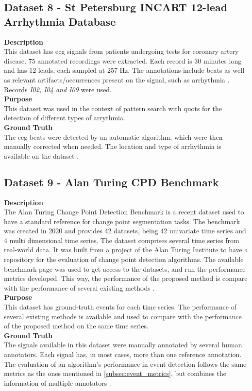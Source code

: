 \subsection{Dataset 8 - St Petersburg INCART 12-lead Arrhythmia Database}
\label{dat:dataset9}
\textbf{Description}\hfill \\
This dataset has \gls{ecg} signals from patients undergoing tests for coronary artery disease. 75 annotated recordings were extracted. Each record is 30 minutes long and has 12 leads, each sampled at 257 Hz. The annotations include beats as well as relevant artifacts/occurrences present on the signal, such as arrhythmia \cite{PhysioNet}. Records \textit{I02, I04 and I09} were used.\\
\textbf{Purpose}\hfill \\
This dataset was used in the context of pattern search with \gls{quots} for the detection of different types of arrythmia.\\
\textbf{Ground Truth}\\
The \gls{ecg} beats were detected by an automatic algorithm, which were then manually corrected when needed. The location and type of arrhythmia is available on the dataset \cite{ecg_arrhythmia}.

\subsection{Dataset 9 - Alan Turing CPD Benchmark}
\label{dat:dataset10}
\textbf{Description}\hfill \\
The Alan Turing Change Point Detection Benchmark is a recent dataset used to have a standard reference for change point segmentation tasks. The benchmark was created in 2020 and provides 42 datasets, being 42 univariate time series and 4 multi dimensional time series. The dataset comprises several time series from real-world data. It was built from a project of the Alan Turing Institute to have a repository for the evaluation of change point detection algorithms. The available benchmark page was used to get access to the datasets, and run the performance metrics developed. This way, the performance of the proposed method is compare with the performance of several existing methods \cite{cpd_alan}.\\
\textbf{Purpose}\hfill \\
This dataset has ground-truth events for each time series. The performance of several existing methods is available and used to compare with the performance of the proposed method on the same time series.\\
\textbf{Ground Truth}\\
The signals available in this dataset were manually annotated by several human annotators. Each signal has, in most cases, more than one reference annotation. The evaluation of an algorithm's performance in event detection follows the same metrics as the ones mentioned in \ref{subsec:event_metrics}, but combines the information of multiple annotators \cite{cpd_alan}.

